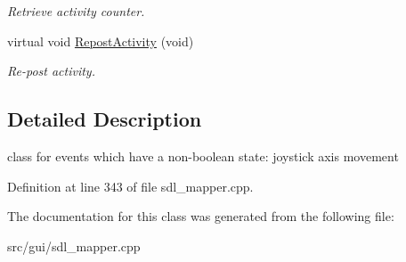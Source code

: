 \begin{DoxyCompactItemize}
\begin{DoxyCompactList}\small\item\em Retrieve activity counter. \end{DoxyCompactList}\item 
\hypertarget{classCContinuousEvent_a55ff5be014e082075eaeec0af43a51aa}{virtual void \hyperlink{classCContinuousEvent_a55ff5be014e082075eaeec0af43a51aa}{Repost\-Activity} (void)}\label{classCContinuousEvent_a55ff5be014e082075eaeec0af43a51aa}

\begin{DoxyCompactList}\small\item\em Re-\/post activity. \end{DoxyCompactList}\end{DoxyCompactItemize}


\subsection{Detailed Description}
class for events which have a non-\/boolean state\-: joystick axis movement 

Definition at line 343 of file sdl\-\_\-mapper.\-cpp.



The documentation for this class was generated from the following file\-:\begin{DoxyCompactItemize}
\item 
src/gui/sdl\-\_\-mapper.\-cpp\end{DoxyCompactItemize}

